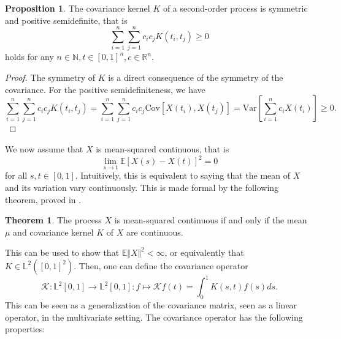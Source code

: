 \documentclass[10pt, a4paper]{report}
\newcommand{\E}[0]{\mathbb{E}}
\newcommand{\N}[0]{\mathbb{N}}
\newcommand{\Ll}[0]{\mathbb{L}}
\newcommand{\R}[0]{\mathbb{R}}
\newcommand{\K}[0]{\mathcal{K}}
\theoremstyle{definition}
\newtheorem{theorem}{Theorem}
\newtheorem{prop}{Proposition}
\theoremstyle{remark}
\begin{document}
\begin{prop}
	The covariance kernel $K$ of a second-order process is symmetric and positive semidefinite, that is 
	$$\sum_{i=1}^{n}\sum_{j=1}^{n}c_i c_j K(t_i,t_j) \geq 0$$
	holds for any $n\in \N,t \in [0,1]^n, c\in \R^n$.
	\begin{proof}
		The symmetry of $K$ is a direct consequence of the symmetry of the covariance. For the positive semidefiniteness, we have
		$$\sum_{i=1}^{n}\sum_{j=1}^{n}c_i c_j K(t_i,t_j) = \sum_{i=1}^{n}\sum_{j=1}^{n}c_i c_j \mathrm{Cov}[X(t_i),X(t_j)] = \mathrm{Var}\left[\sum_{i=1}^{n}c_iX(t_i)\right]\geq  0.$$
	\end{proof}
\end{prop} 
We now assume that $X$ is mean-squared continuous, that is 
$$\lim_{s\to t} \E[X(s)-X(t)]^2 = 0$$
for all $s,t \in [0,1]$. Intuitively, this is equivalent to saying that the mean of $X$ and its variation vary continuously. This is made formal by the following theorem, proved in \cite[Theorem 7.2.4]{found}.
\begin{theorem}
	The process $X$ is mean-squared continuous if and only if the mean $\mu$ and covariance kernel $K$ of $X$ are continuous.
\end{theorem}
This can be used to show that $\E\Vert X \Vert^2 < \infty$, or equivalently that $K \in \Ll^2([0,1]^2)$. Then, one can define the covariance operator
$$\K:\Ll^2[0,1] \to \Ll^2[0,1]: f \mapsto \K f(t) = \int_{0}^{1}K(s,t)f(s)ds.$$
This can be seen as a generalization of the covariance matrix, seen as a linear operator, in the multivariate setting. The covariance operator has the following properties:
\end{document}
